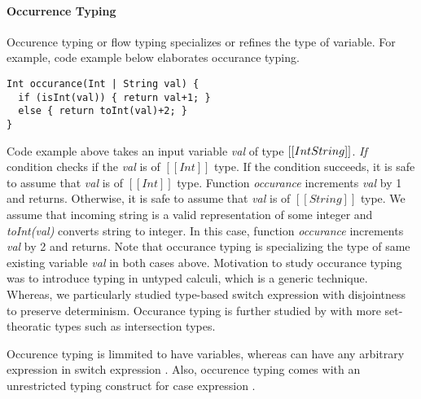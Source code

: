 \paragraph{Occurrence Typing}
Occurence typing or flow typing \citet{tobin2008design} specializes or refines 
the type of variable. For example, code example below elaborates occurance typing.

\begin{lstlisting}[xleftmargin=.2\textwidth, xrightmargin=.2\textwidth]
Int occurance(Int | String val) {
  if (isInt(val)) { return val+1; }
  else { return toInt(val)+2; }
}
\end{lstlisting}

\noindent Code example above takes an input variable \emph{val}
of type $[[Int \/ String]]$. 
\emph{If} condition checks if the \emph{val} is of $[[Int]]$ type.
If the condition succeeds, it is safe to assume that \emph{val} is of $[[Int]]$ type.
Function \emph{occurance} increments \emph{val} by 1 and returns.
Otherwise, it is safe to assume that \emph{val} is of $[[String]]$ type.
We assume that incoming string is a valid representation of some integer
and \emph{toInt(val)} converts string to integer.
In this case, function \emph{occurance} increments \emph{val} by 2 and returns.
Note that occurance typing is specializing the type of
same existing variable \emph{val} in both cases above.
Motivation to study occurance typing was to introduce typing in untyped calculi,
which is a generic technique.
Whereas, we particularly studied type-based switch expression
with disjointness to preserve determinism.
Occurance typing is further studied by \cite{tobin2010logical,castagna2019revisiting}
with more set-theoratic types such as intersection types.


Occurence typing is limmited to have variables, whereas \cal
can have any arbitrary expression in switch expression
.
Also, occurence typing comes with an
unrestricted typing construct for case expression
.

